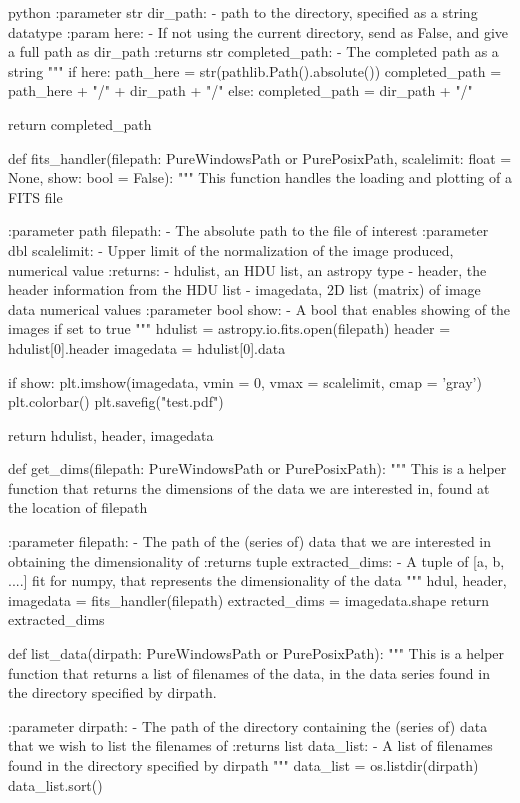 \documentclass[../main.tex]{subfiles}
\begin{document}
\begin{mintedbox}{python}
:parameter str dir_path:
- path to the directory, specified as a string datatype
:param here:
- If not using the current directory, send as False, and
give a full path as dir_path
:returns str completed_path:
- The completed path as a string
"""
if here:
path_here        =    str(pathlib.Path().absolute())
completed_path   =    path_here + "/" + dir_path + "/"
else:
completed_path   =    dir_path + "/"

return completed_path


def fits_handler(filepath: PureWindowsPath or PurePosixPath, scalelimit: float  =  None, show: bool  =  False):
"""
This function handles the loading and plotting of a FITS file

:parameter path filepath:
- The absolute path to the file of interest
:parameter dbl scalelimit:
- Upper limit of the normalization of the image produced, numerical value
:returns:
- hdulist, an HDU list, an astropy type
- header, the header information from the HDU list
- imagedata, 2D list (matrix) of image data numerical values
:parameter bool show:
- A bool that enables showing of the images if set to true
"""
hdulist      =    astropy.io.fits.open(filepath)
header       =    hdulist[0].header
imagedata    =    hdulist[0].data

if show:
plt.imshow(imagedata, vmin = 0, vmax = scalelimit, cmap = 'gray')
plt.colorbar()
plt.savefig("test.pdf")

return hdulist, header, imagedata


def get_dims(filepath: PureWindowsPath or PurePosixPath):
"""
This is a helper function that returns the dimensions of
the data we are interested in, found at the location of
filepath

:parameter filepath:
- The path of the (series of) data that we are
interested in obtaining the dimensionality of
:returns tuple extracted_dims:
- A tuple of [a, b, ....] fit for numpy, that
represents the dimensionality of the data
"""
hdul, header, imagedata  =  fits_handler(filepath)
extracted_dims  =  imagedata.shape
return extracted_dims


def list_data(dirpath: PureWindowsPath or PurePosixPath):
"""
This is a helper function that returns a list of filenames
of the data, in the data series found in the directory
specified by dirpath.

:parameter dirpath:
- The path of the directory containing the (series of)
data that we wish to list the filenames of
:returns list data_list:
- A list of filenames found in the directory specified
by dirpath
"""
data_list  =  os.listdir(dirpath)
data_list.sort()


\end{mintedbox}
\end{document}
